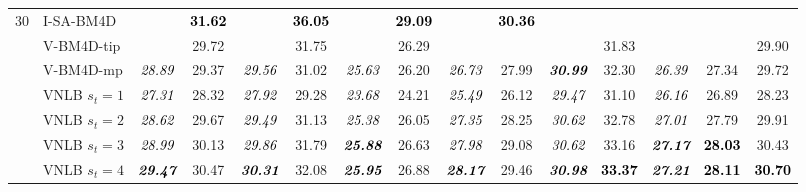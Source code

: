 \documentclass[10pt, journal, twocolumn, final, a4paper]{IEEEtran}
\newcommand{\bsic}[1]{\textcolor{black}{\textit{#1}}}
\newcommand{\Bsic}[1]{\textcolor{black}{\textbf{\textit{#1}}}}
\newcommand{\Best}[1]{\textbf{\textcolor{black}{#1}}}
\begin{document}
\begin{table}[htp!]
\begin{center}
{\begin{tabular}{ c | l |c c | c c | c c | c c | c c | c c | c }
%
			\multirow{1}{*}{$30$}
			                      & I-SA-BM4D            & \bsic{     } & \Best{31.62} & \bsic{     } & \Best{36.05}  & \bsic{     } & \Best{29.09}  & \bsic{     } & \Best{30.36} &              &               &              &              &              \\
			                      & V-BM4D-tip           & \bsic{     } &       29.72  &              &       31.75   & \bsic{     } &       26.29   &              &              &              &       31.83   &              &              &       29.90  \\
			                      & V-BM4D-mp            & \bsic{28.89} &       29.37  & \bsic{29.56} &       31.02   & \bsic{25.63} &       26.20   & \bsic{26.73} &       27.99  & \Bsic{30.99} &       32.30   & \bsic{26.39} &       27.34  &       29.72  \\
			                      & VNLB   $s_t = 1$     & \bsic{27.31} &       28.32  & \bsic{27.92} &       29.28   & \bsic{23.68} &       24.21   & \bsic{25.49} &       26.12  & \bsic{29.47} &       31.10   & \bsic{26.16} &       26.89  &       28.23  \\
			                      & VNLB   $s_t = 2$     & \bsic{28.62} &       29.67  & \bsic{29.49} &       31.13   & \bsic{25.38} &       26.05   & \bsic{27.35} &       28.25  & \bsic{30.62} &       32.78   & \bsic{27.01} &       27.79  &       29.91  \\
			                      & VNLB   $s_t = 3$     & \bsic{28.99} &       30.13  & \bsic{29.86} &       31.79   & \Bsic{25.88} &       26.63   & \bsic{27.98} &       29.08  & \bsic{30.62} &       33.16   & \Bsic{27.17} & \Best{28.03} &       30.43  \\
			                      & VNLB   $s_t = 4$     & \Bsic{29.47} &       30.47  & \Bsic{30.31} &       32.08   & \Bsic{25.95} &       26.88   & \Bsic{28.17} &       29.46  & \Bsic{30.98} & \Best{33.37}  & \Bsic{27.21} & \Best{28.11} & \Best{30.70} \\\hline

\end{tabular}}
\end{center}
\end{table}
\end{document}

